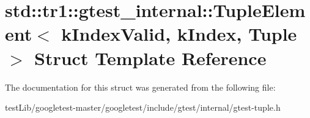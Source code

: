 \hypertarget{structstd_1_1tr1_1_1gtest__internal_1_1TupleElement}{}\section{std\+:\+:tr1\+:\+:gtest\+\_\+internal\+:\+:Tuple\+Element$<$ k\+Index\+Valid, k\+Index, Tuple $>$ Struct Template Reference}
\label{structstd_1_1tr1_1_1gtest__internal_1_1TupleElement}


The documentation for this struct was generated from the following file\+:\begin{DoxyCompactItemize}
\item 
test\+Lib/googletest-\/master/googletest/include/gtest/internal/gtest-\/tuple.\+h\end{DoxyCompactItemize}
